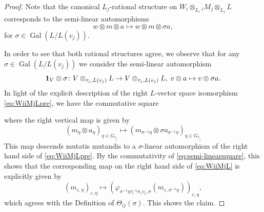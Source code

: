 \documentclass[a4paper,12pt,reqno]{amsart}
\DeclareMathOperator{\Gal}{\mathrm {Gal}}
\theoremstyle{plain}
\theoremstyle{remark}
\begin{document}
    \begin{proof}
      Note that the canonical $L_j$-rational structure on $W_i \otimes_{L_i} {}_iM_j\otimes_{L_j}L$ corresponds to the semi-linear automorphisms
      \[w\otimes m\otimes a\mapsto w\otimes m\otimes\sigma a,\]
      for $\sigma\in\Gal(L/L(v_j))$.

      In order to see that both rational structures agree, we observe that for any $\sigma\in\Gal(L/L(v_j))$ we consider the semi-linear automorphism
    \[
    {\bf1}_{V}\otimes \sigma\colon V\otimes_{\tau_\varepsilon,L(v_j)}L\to V\otimes_{\tau_\varepsilon,L(v_j)}L,\;v\otimes a\mapsto v\otimes\sigma a.
    \]
    In light of the explicit description of the right $L$-vector space isomorphism \eqref{eq:WiiMjLpre}, we have the commutative square
    \begin{center}
    \end{center}
    where the right vertical map is given by
    \begin{equation}
      (m_\eta\otimes a_\eta)_{\eta\in G_{v_j}}\mapsto (m_{\sigma^{-1}\eta}\otimes \sigma a_{\sigma^{-1}\eta} )_{\eta\in G_{v_j}}
      \label{eq:explicitdecompositiontwisting}
    \end{equation}
    This map descends mutatis mutandis to a $\sigma$-linear automorphism of the right hand side of \eqref{eq:WiiMjLpre}. By the commutativity of \eqref{eq:semi-linearsquare}, this shows that the corresponding map on the right hand side of \eqref{eq:WiiMjL} is explicitly given by
    \[
    (m_{\varepsilon,\eta})_{\varepsilon,\eta}\mapsto
    \left(\varphi_{\sigma^{-1}\eta\tau_\varepsilon^{-1}\sigma_\varepsilon v_i,\sigma}(m_{\varepsilon,\sigma^{-1}\eta})\right)_{\varepsilon,\eta},
    \]
    which agrees with the Definition of $\Theta_{ij}(\sigma)$. This shows the claim.
    \end{proof}
    
\end{document}
